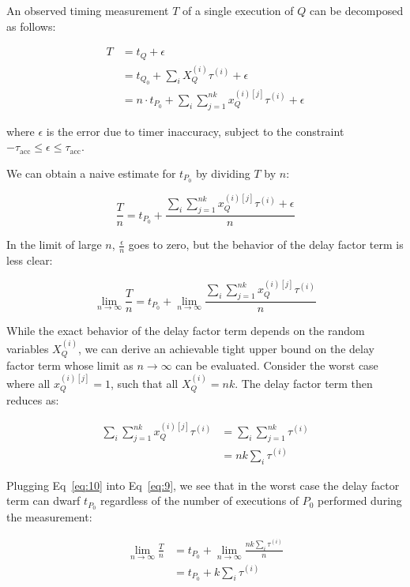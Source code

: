 \documentclass[conference]{IEEEtran}
\begin{document}
An observed timing measurement $T$ of a single execution of $Q$ can be decomposed as
follows:

\begin{align}
    T &= t_{Q} + \epsilon \\ \nonumber
      &= t_{Q_0} + \sum_{i} X_Q^{(i)} \tau^{(i)} + \epsilon \\ \nonumber
      &= n \cdot t_{P_0} + \sum_{i} \sum_{j=1}^{nk} x_Q^{(i)[j]} \tau^{(i)} + \epsilon
\end{align}

where $\epsilon$ is the error due to timer inaccuracy, subject to the
constraint $-\tau_{\textrm{acc}} \le \epsilon \le \tau_{\textrm{acc}}$.

We can obtain a naive estimate for $t_{P_0}$ by dividing $T$ by $n$:

\begin{equation}
    \frac{T}{n} = t_{P_0} + \frac{\sum_{i} \sum_{j=1}^{nk} x_Q^{(i)[j]} \tau^{(i)} + \epsilon}{n}
\end{equation}

In the limit of large $n$, $\frac{\epsilon}{n}$ goes to zero, but the behavior of the delay
factor term is less clear:

\begin{equation}
    \lim_{n\to\infty} \frac{T}{n} = t_{P_0} + \lim_{n\to\infty} \frac{\sum_{i} \sum_{j=1}^{nk} x_Q^{(i)[j]} \tau^{(i)}}{n}
\end{equation}

While the exact behavior of the delay factor term depends on the random variables
$X_Q^{(i)}$, we can derive an achievable tight upper bound on the delay factor term whose
limit as $n \to \infty$ can be evaluated. Consider the worst case where all $x_Q^{(i)[j]} =
1$, such that all $X_Q^{(i)} = nk$. The delay factor term then reduces as:

\begin{align}
    \sum_{i} \sum_{j=1}^{nk} x_Q^{(i)[j]} \tau^{(i)} &= \sum_{i} \sum_{j=1}^{nk} \tau^{(i)} \\ \nonumber
                                                     &= nk \sum_{i} \tau^{(i)}
\end{align}

Plugging Eq~\ref{eq:10} into Eq~\ref{eq:9}, we see that in the worst case the delay factor
term can dwarf $t_{P_0}$ regardless of the number of executions of $P_0$ performed during
the measurement:

\begin{align}
    \lim_{n\to\infty} \frac{T}{n} &= t_{P_0} + \lim_{n\to\infty} \frac{nk \sum_{i} \tau^{(i)}}{n} \\ \nonumber
                                  &= t_{P_0} + k \sum_{i} \tau^{(i)}
\end{align}
\end{document}
